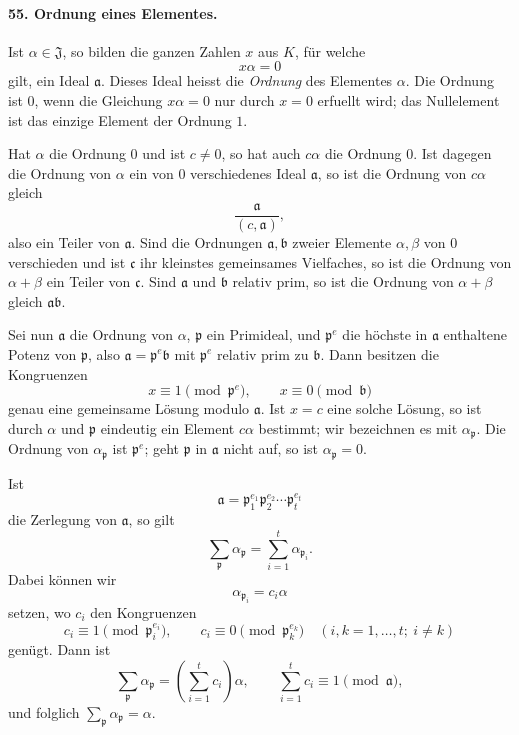 \documentclass[11pt]{article}
\begin{document}
\paragraph{55. Ordnung eines Elementes.}
Ist $\alpha\in\mathfrak J$, so bilden die ganzen Zahlen $x$ aus $K$, für welche
\[
  x\alpha=0
\]
gilt, ein Ideal $\mathfrak a$. Dieses Ideal heisst die \emph{Ordnung} des Elementes $\alpha$. Die Ordnung ist $0$, wenn die Gleichung $x\alpha=0$ nur durch $x=0$ erfuellt wird; das Nullelement ist das einzige Element der Ordnung $1$.

Hat $\alpha$ die Ordnung $0$ und ist $c\ne0$, so hat auch $c\alpha$ die Ordnung $0$. Ist dagegen die Ordnung von $\alpha$ ein von $0$ verschiedenes Ideal $\mathfrak a$, so ist die Ordnung von $c\alpha$ gleich
\[
  \frac{\mathfrak a}{(c,\mathfrak a)},
\]
also ein Teiler von $\mathfrak a$. Sind die Ordnungen $\mathfrak a,\mathfrak b$ zweier Elemente $\alpha,\beta$ von $0$ verschieden und ist $\mathfrak c$ ihr kleinstes gemeinsames Vielfaches, so ist die Ordnung von $\alpha+\beta$ ein Teiler von $\mathfrak c$. Sind $\mathfrak a$ und $\mathfrak b$ relativ prim, so ist die Ordnung von $\alpha+\beta$ gleich $\mathfrak a\mathfrak b$.

Sei nun $\mathfrak a$ die Ordnung von $\alpha$, $\mathfrak p$ ein Primideal, und $\mathfrak p^e$ die höchste in $\mathfrak a$ enthaltene Potenz von $\mathfrak p$, also $\mathfrak a=\mathfrak p^e\mathfrak b$ mit $\mathfrak p^e$ relativ prim zu $\mathfrak b$. Dann besitzen die Kongruenzen
\begin{equation}
  x\equiv1\pmod{\mathfrak p^e},
  \qquad
  x\equiv0\pmod{\mathfrak b}
\tag{88}
\end{equation}
genau eine gemeinsame Lösung modulo $\mathfrak a$. Ist $x=c$ eine solche Lösung, so ist durch $\alpha$ und $\mathfrak p$ eindeutig ein Element $c\alpha$ bestimmt; wir bezeichnen es mit $\alpha_{\mathfrak p}$. Die Ordnung von $\alpha_{\mathfrak p}$ ist $\mathfrak p^e$; geht $\mathfrak p$ in $\mathfrak a$ nicht auf, so ist $\alpha_{\mathfrak p}=0$.

Ist
\[
  \mathfrak a=\mathfrak p_1^{e_1}\mathfrak p_2^{e_2}\cdots\mathfrak p_t^{e_t}
\]
die Zerlegung von $\mathfrak a$, so gilt
\begin{equation}
  \sum_{\mathfrak p}\alpha_{\mathfrak p}=\sum_{i=1}^{t}\alpha_{\mathfrak p_i}.
\tag{89}
\end{equation}
Dabei können wir
\begin{equation}
  \alpha_{\mathfrak p_i}=c_i\alpha
\tag{90}
\end{equation}
setzen, wo $c_i$ den Kongruenzen
\begin{equation}
  c_i\equiv1\pmod{\mathfrak p_i^{e_i}},\qquad
  c_i\equiv0\pmod{\mathfrak p_k^{e_k}}
  \quad (i,k=1,\ldots,t;\ i\ne k)
\tag{91}
\end{equation}
genügt. Dann ist
\[
  \sum_{\mathfrak p}\alpha_{\mathfrak p}
  =\left(\sum_{i=1}^{t}c_i\right)\alpha,
  \qquad
  \sum_{i=1}^{t}c_i\equiv1\pmod{\mathfrak a},
\]
und folglich $\sum_{\mathfrak p}\alpha_{\mathfrak p}=\alpha$.
\end{document}
